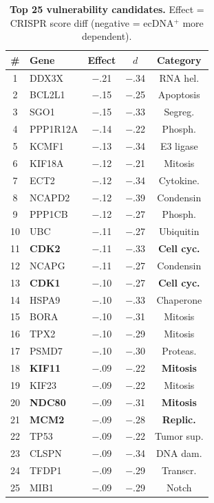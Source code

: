 \documentclass[sigconf,anonymous]{acmart}
\begin{document}
\begin{table}[h]
\caption{\textbf{Top 25 vulnerability candidates.} Effect = CRISPR score diff (negative = ecDNA$^+$ more dependent).}
\label{tab:top_vuln}
\centering
\footnotesize
\begin{tabular}{@{}clccc@{}}
\toprule
\# & Gene & Effect & $d$ & Category \\
\midrule
1 & DDX3X & $-$.21 & $-$.34 & RNA hel. \\
2 & BCL2L1 & $-$.15 & $-$.25 & Apoptosis \\
3 & SGO1 & $-$.15 & $-$.33 & Segreg. \\
4 & PPP1R12A & $-$.14 & $-$.22 & Phosph. \\
5 & KCMF1 & $-$.13 & $-$.34 & E3 ligase \\
6 & KIF18A & $-$.12 & $-$.21 & Mitosis \\
7 & ECT2 & $-$.12 & $-$.34 & Cytokine. \\
8 & NCAPD2 & $-$.12 & $-$.39 & Condensin \\
9 & PPP1CB & $-$.12 & $-$.27 & Phosph. \\
10 & UBC & $-$.11 & $-$.27 & Ubiquitin \\
11 & \textbf{CDK2} & $-$.11 & $-$.33 & \textbf{Cell cyc.} \\
12 & NCAPG & $-$.11 & $-$.27 & Condensin \\
13 & \textbf{CDK1} & $-$.10 & $-$.27 & \textbf{Cell cyc.} \\
14 & HSPA9 & $-$.10 & $-$.33 & Chaperone \\
15 & BORA & $-$.10 & $-$.31 & Mitosis \\
16 & TPX2 & $-$.10 & $-$.29 & Mitosis \\
17 & PSMD7 & $-$.10 & $-$.30 & Proteas. \\
18 & \textbf{KIF11} & $-$.09 & $-$.22 & \textbf{Mitosis} \\
19 & KIF23 & $-$.09 & $-$.22 & Mitosis \\
20 & \textbf{NDC80} & $-$.09 & $-$.31 & \textbf{Mitosis} \\
21 & \textbf{MCM2} & $-$.09 & $-$.28 & \textbf{Replic.} \\
22 & TP53 & $-$.09 & $-$.22 & Tumor sup. \\
23 & CLSPN & $-$.09 & $-$.34 & DNA dam. \\
24 & TFDP1 & $-$.09 & $-$.29 & Transcr. \\
25 & MIB1 & $-$.09 & $-$.29 & Notch \\
\bottomrule
\end{tabular}
\end{table}
\end{document}
